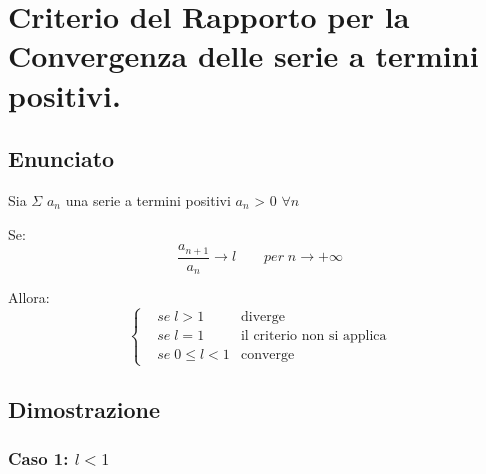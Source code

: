 \documentclass[../dimostrazioni]{subfiles}
\begin{document}
    \chapter{Criterio del Rapporto per la Convergenza delle serie a termini positivi.}
    \label{criterioRapportoSerie}

        \section*{Enunciato}

            Sia \(\Sigma\) \(a_n\) una serie a termini positivi \(a_n\) > 0 \(\forall n\)
            
            Se:
             \[\frac{a_{n+1}}{a_n} \longrightarrow l \qquad  per \; n  \rightarrow +\infty \]
                
            
            
            Allora:
            \[
                \left\{
                    \begin{aligned}
                        &se \; l > 1 & \text{diverge} \\
                        &se \; l = 1 & \text{il criterio non si applica} \\
                        &se \; 0 \leqslant l < 1 & \text{converge}
                    \end{aligned}
                \right.
            \]
            
        \section*{Dimostrazione}
            
            \subsection*{Caso 1:  \(l < 1\)} 
            
\end{document}
